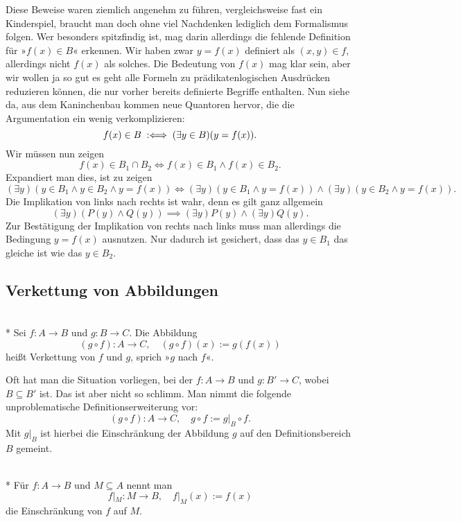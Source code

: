 Diese Beweise waren ziemlich angenehm zu führen, vergleichsweise fast
ein Kinderspiel, braucht man doch ohne viel Nachdenken lediglich dem
Formalismus folgen. Wer besonders spitzfindig ist, mag darin
allerdings die fehlende Definition für »$f(x)\in B$« erkennen.
Wir haben zwar $y=f(x)$ definiert als $(x,y)\in f$, allerdings
nicht $f(x)$ als solches. Die Bedeutung von $f(x)$ mag klar sein,
aber wir wollen ja so gut es geht alle Formeln zu prädikatenlogischen
Ausdrücken reduzieren können, die nur vorher bereits definierte
Begriffe enthalten. Nun siehe da, aus dem Kaninchenbau kommen
neue Quantoren hervor, die die Argumentation ein wenig verkomplizieren:
\[f(x)\in B \;:\Longleftrightarrow\; (\exists y\in B)(y=f(x)).\]
Wir müssen nun zeigen
\[f(x)\in B_1\cap B_2 \iff f(x)\in B_1\land f(x)\in B_2.\]
Expandiert man dies, ist zu zeigen
\[(\exists y)(y\in B_1\land y\in B_2\land y=f(x))
\iff (\exists y)(y\in B_1\land y=f(x))\land (\exists y)(y\in B_2\land y=f(x)).\]
Die Implikation von links nach rechts ist wahr, denn es gilt ganz allgemein
\[(\exists y)(P(y)\land Q(y)) \implies (\exists y)P(y)\land (\exists y)Q(y).\]
Zur Bestätigung der Implikation von rechts nach links muss man
allerdings die Bedingung $y=f(x)$ ausnutzen. Nur dadurch ist gesichert,
dass das $y\in B_1$ das gleiche ist wie das $y\in B_2$.

\subsection{Verkettung von Abbildungen}
\begin{Definition}[Verkettung]\mbox{}\\*
Sei $f\colon A\to B$ und $g\colon B\to C$. Die Abbildung
\[(g\circ f)\colon A\to C,\quad (g\circ f)(x):=g(f(x))\]
heißt Verkettung von $f$ und $g$, sprich »$g$ nach $f$«.
\end{Definition}

\noindent
Oft hat man die Situation vorliegen, bei der $f\colon A\to B$
und $g\colon B'\to C$, wobei $B\subseteq B'$ ist. Das ist aber
nicht so schlimm. Man nimmt die folgende unproblematische
Definitionserweiterung vor:
\[(g\circ f)\colon A\to C,\quad g\circ f := g|_B\circ f.\]
Mit $g|_B$ ist hierbei die Einschränkung der Abbildung $g$
auf den Definitionsbereich $B$ gemeint.

\begin{Definition}[Einschränkung]\mbox{}\\*
Für $f\colon A\to B$ und $M\subseteq A$ nennt man
\[f|_M\colon M\to B,\quad f|_M(x):=f(x)\]
die Einschränkung von $f$ auf $M$.
\end{Definition}

